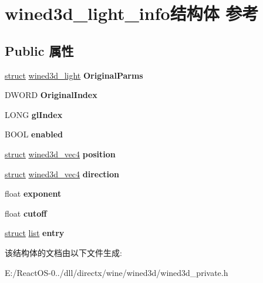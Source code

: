 \hypertarget{structwined3d__light__info}{}\section{wined3d\+\_\+light\+\_\+info结构体 参考}
\label{structwined3d__light__info}
\subsection*{Public 属性}
\begin{DoxyCompactItemize}
\item 
\mbox{\label{structwined3d__light__info_a874faf3fe4c8d74b7249eb649fa318d0}} 
\hyperlink{interfacestruct}{struct} \hyperlink{structwined3d__light}{wined3d\+\_\+light} {\bfseries Original\+Parms}
\item 
\mbox{\label{structwined3d__light__info_a2da0f9f4258904a3a5d9d17b1cec7763}} 
D\+W\+O\+RD {\bfseries Original\+Index}
\item 
\mbox{\label{structwined3d__light__info_abc0ddabd3c9d823fa7a497fa31b6dde4}} 
L\+O\+NG {\bfseries gl\+Index}
\item 
\mbox{\label{structwined3d__light__info_a7362b91dd0025017111da0d6b1ef2971}} 
B\+O\+OL {\bfseries enabled}
\item 
\mbox{\label{structwined3d__light__info_a05795f2a2165f15ff50ee923c7ed6376}} 
\hyperlink{interfacestruct}{struct} \hyperlink{structwined3d__vec4}{wined3d\+\_\+vec4} {\bfseries position}
\item 
\mbox{\label{structwined3d__light__info_abf5204ccdb711df6eb3e39796dd029b8}} 
\hyperlink{interfacestruct}{struct} \hyperlink{structwined3d__vec4}{wined3d\+\_\+vec4} {\bfseries direction}
\item 
\mbox{\label{structwined3d__light__info_a81df487bb0ebf56f1420452bb98a2214}} 
float {\bfseries exponent}
\item 
\mbox{\label{structwined3d__light__info_a35b12136666fe0a4c3cf87be2e7dcd23}} 
float {\bfseries cutoff}
\item 
\mbox{\label{structwined3d__light__info_a322aabddf663a8548e5dc1a9692b7bde}} 
\hyperlink{interfacestruct}{struct} \hyperlink{classlist}{list} {\bfseries entry}
\end{DoxyCompactItemize}


该结构体的文档由以下文件生成\+:\begin{DoxyCompactItemize}
\item 
E\+:/\+React\+O\+S-\/0../dll/directx/wine/wined3d/wined3d\+\_\+private.\+h\end{DoxyCompactItemize}
